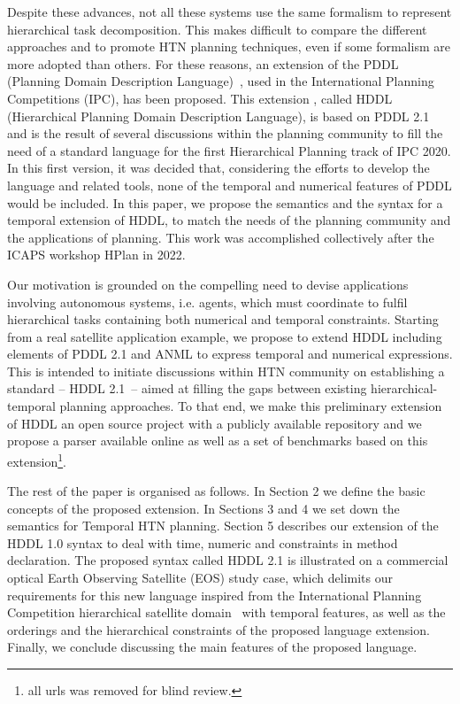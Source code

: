 \documentclass[letterpaper]{article} %
\begin{document}
Despite these advances, not all these systems use the same formalism to represent hierarchical task decomposition. This makes difficult to compare the different approaches and to promote HTN planning techniques, even if some formalism are more adopted than others. For these reasons, an extension of the PDDL (Planning Domain Description Language)~\citep{mcdermott98},  used in the International Planning Competitions (IPC), has been proposed. This extension \citep{holler20}, called HDDL (Hierarchical Planning Domain Description Language), is based on PDDL 2.1 \citep{fox03} and is the result of several discussions within the planning community \citep{Holler19b} to fill the need of a standard language for the first Hierarchical Planning track of IPC 2020. In this first version, it was decided that, considering the efforts to develop the language and related tools, none of the temporal and numerical features of PDDL would be included. In this paper, we propose the semantics and the syntax for a temporal extension of HDDL, to match the needs of the planning community and the applications of planning. This work was accomplished collectively after the ICAPS workshop HPlan in 2022.

Our motivation is grounded on the compelling need to devise applications involving autonomous systems, i.e. agents, which must coordinate to fulfil hierarchical tasks containing both numerical and temporal constraints.
Starting from a real satellite application example, we propose to extend HDDL including elements of PDDL 2.1 and ANML to express temporal and numerical expressions.
This is intended to initiate discussions within HTN community on establishing a standard -- HDDL 2.1~-- aimed at filling the gaps between existing hierarchical-temporal planning approaches. To that end, we make this preliminary extension of HDDL an open source project with a publicly available repository and we propose a parser available online as well as a set of benchmarks based on this extension\footnote{all urls was removed for blind review.}.

The rest of the paper is organised as follows. In Section 2 we define the basic concepts of the proposed extension. In Sections 3 and 4 we set down the semantics for Temporal HTN planning. Section 5 describes our extension of the HDDL 1.0 syntax to deal with time, numeric and constraints in method declaration. The proposed syntax called HDDL 2.1 is illustrated on a commercial optical Earth Observing Satellite (EOS) study case, which delimits our requirements for this new language inspired from the International Planning Competition hierarchical satellite domain~\citep{schattenberg2020} with temporal features, as well as the orderings and the hierarchical constraints of the proposed language extension. Finally, we conclude discussing the main features of the proposed language. %
\end{document}
